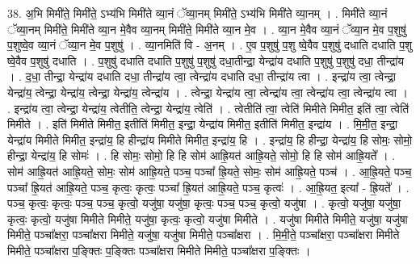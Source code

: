 \documentclass[17pt]{extarticle}
\begin{document}
38. अ॒भि मिमी॑ते॒ मिमी॑ते॒ ऽभ्य॑भि मिमी॑ते व्या॒नं ॅव्या॒नम् मिमी॑ते॒ ऽभ्य॑भि मिमी॑ते व्या॒नम् । . मिमी॑ते व्या॒नं ॅव्या॒नम् मिमी॑ते॒ मिमी॑ते व्या॒न मे॒वैव व्या॒नम् मिमी॑ते॒ मिमी॑ते व्या॒न मे॒व । . व्या॒न मे॒वैव व्या॒नं ॅव्या॒न मे॒व प॒शुषु॑ प॒शुष्वे॒व व्या॒नं ॅव्या॒न मे॒व प॒शुषु॑ । . व्या॒नमिति॑ वि - अ॒नम् । . ए॒व प॒शुषु॑ प॒शु ष्वे॒वैव प॒शुषु॑ दधाति दधाति प॒शु ष्वे॒वैव प॒शुषु॑ दधाति । . प॒शुषु॑ दधाति दधाति प॒शुषु॑ प॒शुषु॑ दधा॒तीन्द्रा॒ येन्द्रा॑य दधाति प॒शुषु॑ प॒शुषु॑ दधा॒ तीन्द्रा॑य । . द॒धा॒ तीन्द्रा॒ येन्द्रा॑य दधाति दधा॒ तीन्द्रा॑य त्वा॒ त्वेन्द्रा॑य दधाति दधा॒ तीन्द्रा॑य त्वा । . इन्द्रा॑य त्वा॒ त्वेन्द्रा॒ येन्द्रा॑य॒ त्वेन्द्रा॒ येन्द्रा॑य॒ त्वेन्द्रा॒ येन्द्रा॑य॒ त्वेन्द्रा॑य । . त्वेन्द्रा॒ येन्द्रा॑य त्वा॒ त्वेन्द्रा॑य त्वा॒ त्वेन्द्रा॑य त्वा॒ त्वेन्द्रा॑य त्वा । . इन्द्रा॑य त्वा॒ त्वेन्द्रा॒ येन्द्रा॑य॒ त्वेतीति॒ त्वेन्द्रा॒ येन्द्रा॑य॒ त्वेति॑ । . त्वेतीति॑ त्वा॒ त्वेति॑ मिमीते मिमीत॒ इति॑ त्वा॒ त्वेति॑ मिमीते । . इति॑ मिमीते मिमीत॒ इतीति॑ मिमीत॒ इन्द्रा॒ येन्द्रा॑य मिमीत॒ इतीति॑ मिमीत॒ इन्द्रा॑य । . मि॒मी॒त॒ इन्द्रा॒ येन्द्रा॑य मिमीते मिमीत॒ इन्द्रा॑य॒ हि हीन्द्रा॑य मिमीते मिमीत॒ इन्द्रा॑य॒ हि । . इन्द्रा॑य॒ हि हीन्द्रा॒ येन्द्रा॑य॒ हि सोमः॒ सोमो॒ हीन्द्रा॒ येन्द्रा॑य॒ हि सोमः॑ । . हि सोमः॒ सोमो॒ हि हि सोम॑ आह्रि॒यत॑ आह्रि॒यते॒ सोमो॒ हि हि सोम॑ आह्रि॒यते᳚ । . सोम॑ आह्रि॒यत॑ आह्रि॒यते॒ सोमः॒ सोम॑ आह्रि॒यते॒ पञ्च॒ पञ्चा᳚ ह्रि॒यते॒ सोमः॒ सोम॑ आह्रि॒यते॒ पञ्च॑ । . आ॒ह्रि॒यते॒ पञ्च॒ पञ्चा᳚ ह्रि॒यत॑ आह्रि॒यते॒ पञ्च॒ कृत्वः॒ कृत्वः॒ पञ्चा᳚ ह्रि॒यत॑ आह्रि॒यते॒ पञ्च॒ कृत्वः॑ । . आ॒ह्रि॒यत॒ इत्या᳚ - ह्रि॒यते᳚ । . पञ्च॒ कृत्वः॒ कृत्वः॒ पञ्च॒ पञ्च॒ कृत्वो॒ यजु॑षा॒ यजु॑षा॒ कृत्वः॒ पञ्च॒ पञ्च॒ कृत्वो॒ यजु॑षा । . कृत्वो॒ यजु॑षा॒ यजु॑षा॒ कृत्वः॒ कृत्वो॒ यजु॑षा मिमीते मिमीते॒ यजु॑षा॒ कृत्वः॒ कृत्वो॒ यजु॑षा मिमीते । . यजु॑षा मिमीते मिमीते॒ यजु॑षा॒ यजु॑षा मिमीते॒ पञ्चा᳚क्षरा॒ पञ्चा᳚क्षरा मिमीते॒ यजु॑षा॒ यजु॑षा मिमीते॒ पञ्चा᳚क्षरा । . मि॒मी॒ते॒ पञ्चा᳚क्षरा॒ पञ्चा᳚क्षरा मिमीते मिमीते॒ पञ्चा᳚क्षरा प॒ङ्क्तिः प॒ङ्क्तिः पञ्चा᳚क्षरा मिमीते मिमीते॒ पञ्चा᳚क्षरा प॒ङ्क्तिः । \newline
\pagebreak
{}
\end{document}
